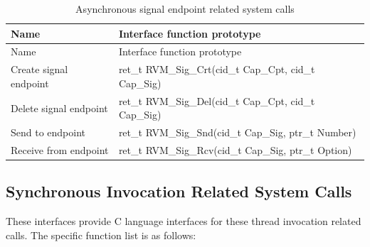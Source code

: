 \begin{xltabular}{\textwidth}{@{}>{\hsize\raggedright\arraybackslash}X>{\hsize\raggedright\arraybackslash}X@{}}
\caption{Asynchronous signal endpoint related system calls}\label{tab:3-10}\\
\toprule
Name & Interface function prototype\tabularnewline
\endfirsthead
\toprule
Name & Interface function prototype\tabularnewline
\midrule
\endhead
\bottomrule
\endlastfoot
Create signal endpoint & ret\_\allowbreak{}t RVM\_\allowbreak{}Sig\_\allowbreak{}Crt(cid\_\allowbreak{}t Cap\_\allowbreak{}Cpt, cid\_\allowbreak{}t
Cap\_\allowbreak{}Sig)\tabularnewline
Delete signal endpoint & ret\_\allowbreak{}t RVM\_\allowbreak{}Sig\_\allowbreak{}Del(cid\_\allowbreak{}t Cap\_\allowbreak{}Cpt, cid\_\allowbreak{}t
Cap\_\allowbreak{}Sig)\tabularnewline
Send to endpoint & ret\_\allowbreak{}t RVM\_\allowbreak{}Sig\_\allowbreak{}Snd(cid\_\allowbreak{}t Cap\_\allowbreak{}Sig, ptr\_\allowbreak{}t
Number)\tabularnewline
Receive from endpoint & ret\_\allowbreak{}t RVM\_\allowbreak{}Sig\_\allowbreak{}Rcv(cid\_\allowbreak{}t Cap\_\allowbreak{}Sig, ptr\_\allowbreak{}t
Option)\tabularnewline
\end{xltabular}

\subsection{Synchronous Invocation Related System Calls}\label{subsec:3-5-7}

These interfaces provide C language interfaces for these thread invocation related calls. The specific function list is as follows:

